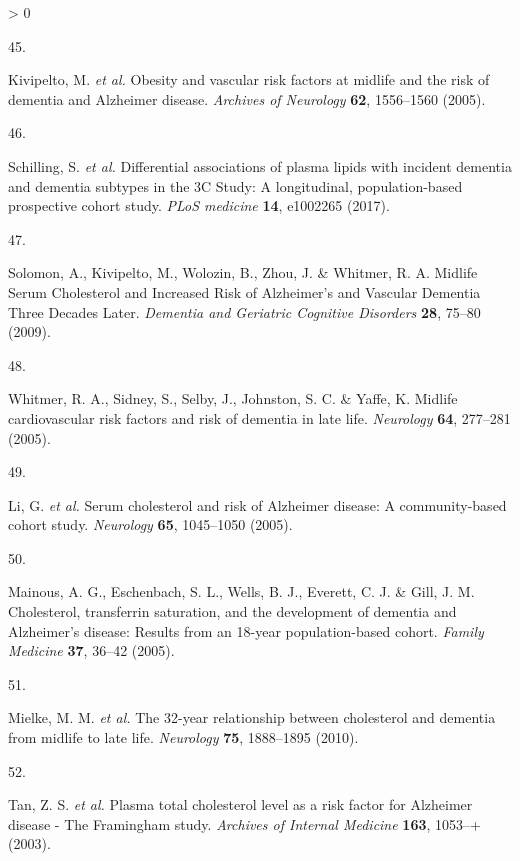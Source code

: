 \documentclass[a4paper, twoside]{templates/ociamthesis}
\newlength{\cslhangindent}
\newlength{\csllabelwidth}
\newenvironment{CSLReferences}[3] %
 {%
  \setlength{\parindent}{0pt}
  \ifodd #1 \everypar{\setlength{\hangindent}{\cslhangindent}}\ignorespaces\fi
  \ifnum #2 > 0
  \setlength{\parskip}{#2\baselineskip}
  \fi
 }%
 {}
\newcommand{\CSLLeftMargin}[1]{\parbox[t]{\maxof{\widthof{#1}}{\csllabelwidth}}{#1}}
\newcommand{\CSLRightInline}[1]{\parbox[t]{\linewidth - \csllabelwidth}{#1}}
\begin{document}
\begin{CSLReferences}{0}{0}
\leavevmode\hypertarget{ref-kivipelto2005}{}%
\CSLLeftMargin{45. }
\CSLRightInline{Kivipelto, M. \emph{et al.} Obesity and vascular risk factors at midlife and the risk of dementia and {Alzheimer} disease. \emph{Archives of Neurology} \textbf{62}, 1556--1560 (2005).}

\leavevmode\hypertarget{ref-schilling2017}{}%
\CSLLeftMargin{46. }
\CSLRightInline{Schilling, S. \emph{et al.} Differential associations of plasma lipids with incident dementia and dementia subtypes in the {3C Study}: {A} longitudinal, population-based prospective cohort study. \emph{PLoS medicine} \textbf{14}, e1002265 (2017).}

\leavevmode\hypertarget{ref-solomon2009}{}%
\CSLLeftMargin{47. }
\CSLRightInline{Solomon, A., Kivipelto, M., Wolozin, B., Zhou, J. \& Whitmer, R. A. Midlife {Serum Cholesterol} and {Increased Risk} of {Alzheimer}'s and {Vascular Dementia Three Decades Later}. \emph{Dementia and Geriatric Cognitive Disorders} \textbf{28}, 75--80 (2009).}

\leavevmode\hypertarget{ref-whitmer2005}{}%
\CSLLeftMargin{48. }
\CSLRightInline{Whitmer, R. A., Sidney, S., Selby, J., Johnston, S. C. \& Yaffe, K. Midlife cardiovascular risk factors and risk of dementia in late life. \emph{Neurology} \textbf{64}, 277--281 (2005).}

\leavevmode\hypertarget{ref-li2005a}{}%
\CSLLeftMargin{49. }
\CSLRightInline{Li, G. \emph{et al.} Serum cholesterol and risk of {Alzheimer} disease: A community-based cohort study. \emph{Neurology} \textbf{65}, 1045--1050 (2005).}

\leavevmode\hypertarget{ref-mainous2005}{}%
\CSLLeftMargin{50. }
\CSLRightInline{Mainous, A. G., Eschenbach, S. L., Wells, B. J., Everett, C. J. \& Gill, J. M. Cholesterol, transferrin saturation, and the development of dementia and {Alzheimer}'s disease: Results from an 18-year population-based cohort. \emph{Family Medicine} \textbf{37}, 36--42 (2005).}

\leavevmode\hypertarget{ref-mielke2010}{}%
\CSLLeftMargin{51. }
\CSLRightInline{Mielke, M. M. \emph{et al.} The 32-year relationship between cholesterol and dementia from midlife to late life. \emph{Neurology} \textbf{75}, 1888--1895 (2010).}

\leavevmode\hypertarget{ref-tan2003a}{}%
\CSLLeftMargin{52. }
\CSLRightInline{Tan, Z. S. \emph{et al.} Plasma total cholesterol level as a risk factor for {Alzheimer} disease - {The Framingham} study. \emph{Archives of Internal Medicine} \textbf{163}, 1053--+ (2003).}


\end{CSLReferences}
\end{document}
